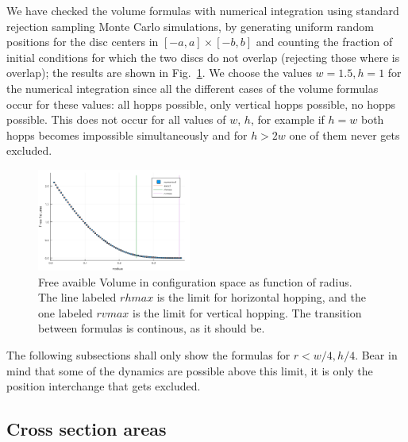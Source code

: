 \documentclass[superscriptaddress,pre,reprint,showpacs,onecolumn]{revtex4-1}
\begin{document}
We have checked the volume formulas with numerical integration using standard rejection sampling Monte Carlo simulations, 
by generating uniform random positions for the disc centers in 
$[-a,a] \times [-b,b]$ and 
counting the fraction of initial conditions for 
which the two discs do not overlap (rejecting those where is overlap); the results are shown in Fig.~\ref{VolMonteC}.
We choose the values $w=1.5, h=1$ for the numerical integration since all the different cases of the volume formulas occur for these values: all hopps possible, only vertical hopps possible, no hopps possible. This does not occur for all values of $w$, $h$, for example if $h=w$ both hopps becomes impossible simultaneously and for $h>2w$ one of them never gets excluded.

\begin{figure}[h]
\centering
\includegraphics[width=0.45\textwidth]{./figures/FreeVolume01.png}
\caption{Free avaible Volume in configuration space as function of radius. The
  line labeled $rhmax$ is the limit for horizontal hopping, and the one labeled
  $rvmax$ is the limit for vertical hopping. The transition between formulas
is continous, as it should be.}
\label{VolMonteC}%
\end{figure}

The following subsections shall only show the formulas for $r<w/4, h/4$.
Bear in mind that some of the dynamics are possible above this limit,
it is only the position interchange that gets excluded. \\



\subsection{Cross section areas}\label{areahop}
\end{document}
